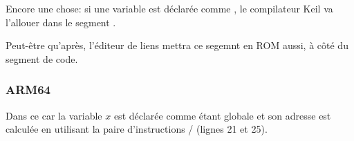 Encore une chose: si une variable est déclarée comme , le compilateur
Keil va l'allouer dans le segment .

Peut-être qu'après, l'éditeur de liens mettra ce segemnt en ROM aussi, à côté du segment de code.

\subsubsection{ARM64}




Dans ce car la variable $x$ est déclarée comme étant globale et son adresse est
calculée en utilisant la paire d'instructions / (lignes 21 et 25).

